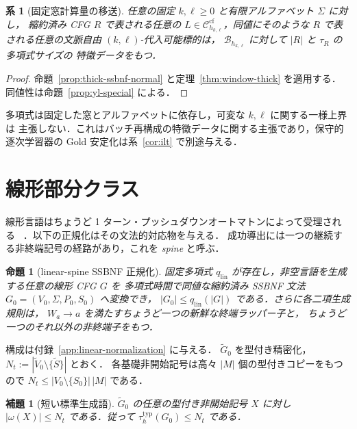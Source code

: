 \documentclass[11pt,a4paper]{ltjsarticle}
\newtheorem{lemma}[theorem]{補題}
\newtheorem{proposition}[theorem]{命題}
\newtheorem{corollary}[theorem]{系}
\theoremstyle{remark}
\theoremstyle{plain}
\newcommand{\cf}{\mathrm{cf}}
\newcommand{\Ccf}[1]{\mathcal C_{#1}^{\cf}}
\begin{document}
\begin{corollary}[固定窓計算量の移送]
\label{cor:window-transfer}
任意の固定 $k,\ell\ge0$ と有限アルファベット $\Sigma$ に対し，
縮約済み CFG $R$ で表される任意の $L\in\Ccf{h_{k,\ell}}$，同値にそのような
$R$ で表される任意の文脈自由 $(k,\ell)$-代入可能標的は，
$\mathcal B_{h_{k,\ell}}$ に対して $|R|$ と $\tau_R$ の多項式サイズの
特徴データをもつ．
\end{corollary}
\begin{proof}
命題~\ref{prop:thick-ssbnf-normal} と定理~\ref{thm:window-thick} を適用する．
同値性は命題~\ref{prop:yl-special} による．
\end{proof}

多項式は固定した窓とアルファベットに依存し，可変な $k,\ell$ に関する一様上界は
主張しない．これはバッチ再構成の特徴データに関する主張であり，保守的逐次学習器の
Gold 安定化は系~\ref{cor:ilt} で別途与える．

\section{線形部分クラス}
\label{sec:linear}

線形言語はちょうど 1 ターン・プッシュダウンオートマトンによって受理される
~\cite{ginsburg-spanier1966,autebert1997}．以下の正規化はその文法的対応物を与える．
成功導出には一つの継続する非終端記号の経路があり，これを \emph{spine} と呼ぶ．

\begin{proposition}[linear-spine SSBNF 正規化]\label{prop:linear-normal}
固定多項式 $q_{\mathrm{lin}}$ が存在し，非空言語を生成する任意の線形 CFG $G$ を
多項式時間で同値な縮約済み SSBNF 文法 $G_0=(V_0,\Sigma,P_0,S_0)$ へ変換でき，
$|G_0|\le q_{\mathrm{lin}}(|G|)$ である．さらに各二項生成規則は，
$W_a\to a$ を満たすちょうど一つの新鮮な終端ラッパー子と，
ちょうど一つのそれ以外の非終端子をもつ．
\end{proposition}

構成は付録~\ref{app:linear-normalization} に与える．
$\widetilde G_0$ を型付き精密化，
$N_t:=|\widetilde V_0\setminus\{\widetilde S\}|$ とおく．
各基礎非開始記号は高々 $|M|$ 個の型付きコピーをもつので
$N_t\le|V_0\setminus\{S_0\}|\,|M|$ である．

\begin{lemma}[短い標準生成語]\label{lem:linear-short}
$\widetilde G_0$ の任意の型付き非開始記号 $X$ に対し
$|\omega(X)|\le N_t$
である．従って $\tau_h^{\mathrm{typ}}(G_0)\le N_t$ である．
\end{lemma}
\end{document}
